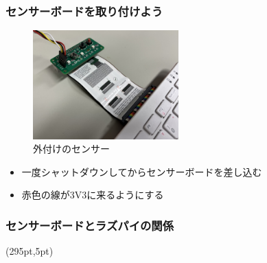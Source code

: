 \begin{frame}
  \frametitle{センサーボードを取り付けよう}
  \begin{figure}
    \centering
    \includegraphics[width=0.5\textwidth]{../images/chap03/how_to_install_bme280.jpg}
    \caption{外付けのセンサー}
  \end{figure}
  \begin{itemize}
    \item 一度シャットダウンしてからセンサーボードを差し込む
    \item 赤色の線が3V3に来るようにする
  \end{itemize}
\end{frame}

\begin{frame}
  \frametitle{センサーボードとラズパイの関係}
  \begin{figure}
    
  \end{figure}
  \begin{textblock*}{0.4\linewidth}(295pt,5pt)
  \end{textblock*}
\end{frame}



